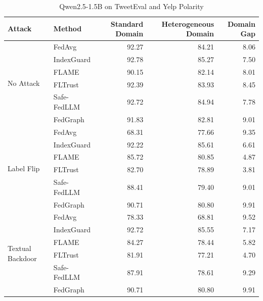 \documentclass[10pt]{article}
\begin{document}
\begin{table}[htbp]
\centering
\caption{Qwen2.5-1.5B on TweetEval and Yelp Polarity}
\label{tab:qwen15_tweet_yelp}
\small
\begin{tabular}{llrrr}
\toprule
Attack & Method & Standard Domain & Heterogeneous Domain & Domain Gap \\
\midrule
\multirow{6}{*}{No Attack} & FedAvg & 92.27 & 84.21 & 8.06 \\
 & IndexGuard & 92.78 & 85.27 & 7.50 \\
 & FLAME & 90.15 & 82.14 & 8.01 \\
 & FLTrust & 92.39 & 83.93 & 8.45 \\
 & Safe-FedLLM & 92.72 & 84.94 & 7.78 \\
 & FedGraph & 91.83 & 82.81 & 9.01 \\
\midrule
\multirow{6}{*}{Label Flip} & FedAvg & 68.31 & 77.66 & 9.35 \\
 & IndexGuard & 92.22 & 85.61 & 6.61 \\
 & FLAME & 85.72 & 80.85 & 4.87 \\
 & FLTrust & 82.70 & 78.89 & 3.81 \\
 & Safe-FedLLM & 88.41 & 79.40 & 9.01 \\
 & FedGraph & 90.71 & 80.80 & 9.91 \\
\midrule
\multirow{6}{*}{Textual Backdoor} & FedAvg & 78.33 & 68.81 & 9.52 \\
 & IndexGuard & 92.72 & 85.55 & 7.17 \\
 & FLAME & 84.27 & 78.44 & 5.82 \\
 & FLTrust & 81.91 & 77.21 & 4.70 \\
 & Safe-FedLLM & 87.91 & 78.61 & 9.29 \\
 & FedGraph & 90.71 & 80.80 & 9.91 \\
\bottomrule
\end{tabular}
\end{table}
\clearpage
\end{document}
